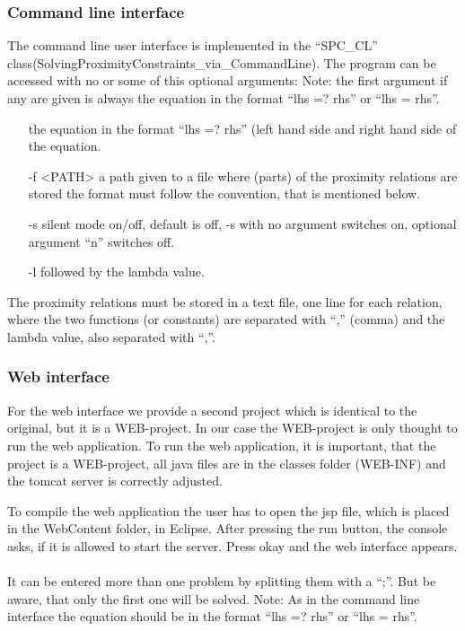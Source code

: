 \documentclass{article}
\begin{document}
\subsubsection{Command line interface}
The command line user interface is implemented in the ``SPC\_CL'' class(SolvingProximityConstraints\_via\_CommandLine). The program can be accessed with no or some of this optional arguments:
Note: the first argument if any are given is always the equation in the format ``lhs =? rhs'' or ``lhs = rhs''. 
\begin{itemize}
	\item [] the equation in the format ``lhs =? rhs'' (left hand side and right hand side of the equation.
	\item [-f] <PATH> a path given to a file where (parts) of the proximity relations are stored the format must follow the convention, that is mentioned below.
	\item [-s] silent mode on/off, default is off, -s with no argument switches on, optional argument ``n'' switches off.
	\item [-l] followed by the lambda value.
\end{itemize}

The proximity relations must be stored in a text file, one line for each relation, where the two functions (or constants) are separated with ``,'' (comma) and the lambda value, also separated with ``,''.

\subsubsection{Web interface}
For the web interface we provide a second project which is identical to the original, but it is a WEB-project. In our case the WEB-project is only thought to run the web application. To run the web application, it is important, that the project is a WEB-project, all java files are in the classes folder (WEB-INF) and the tomcat server is correctly adjusted.

 To compile the web application the user has to open the jsp file, which is placed in the WebContent folder, in Eclipse. After pressing the run button, the console asks, if it is allowed to start the server. Press okay and the web interface appears.\\
\\
It can be entered more than one problem by splitting them with a ``;''. But be aware, that only the first one will be solved.
Note: As in the command line interface the equation should be in the format ``lhs =? rhs'' or ``lhs = rhs''.
\end{document}
